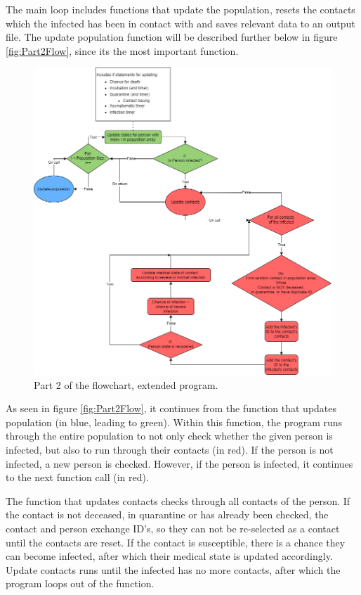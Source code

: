 The main loop includes functions that update the population, resets the contacts which the infected has been in contact with and saves relevant data to an output file. The update population function will be described further below in figure \vref{fig:Part2Flow}, since its the most important function. 

\begin{figure}[H]
  \centering
  \includegraphics[width=\textwidth]{0_billeder/Part2Flowchart.png}
  \caption{Part 2 of the flowchart, extended program.}
  \label{fig:Part2Flow}
\end{figure}

As seen in figure \vref{fig:Part2Flow}, it continues from the function that updates population (in blue, leading to green). Within this function, the program runs through the entire population to not only check whether the given person is infected, but also to run through their contacts (in red). If the person is not infected, a new person is checked. However, if the person is infected, it continues to the next function call (in red).

The function that updates contacts checks through all contacts of the person. If the contact is not deceased, in quarantine or has already been checked, the contact and person exchange ID's, so they can not be re-selected as a contact until the contacts are reset. 
If the contact is susceptible, there is a chance they can become infected, after which their medical state is updated accordingly. Update contacts runs until the infected has no more contacts, after which the program loops out of the function.